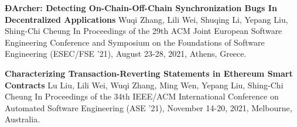 \begin{scholarship}


	{\textbf{ÐArcher: Detecting On-Chain-Off-Chain Synchronization Bugs In Decentralized Applications}}
	{Wuqi Zhang, Lili Wei, Shuqing Li, Yepang Liu, Shing-Chi Cheung}
	\scholarshipentry{}
	{In Proceedings of the 29th ACM Joint European Software Engineering Conference and Symposium on the Foundations of Software Engineering (ESEC/FSE '21), August 23-28, 2021, Athens, Greece.}

	{\textbf{Characterizing Transaction-Reverting Statements in Ethereum Smart Contracts}}
	{Lu Liu, Lili Wei, Wuqi Zhang, Ming Wen, Yepang Liu, Shing-Chi Cheung}
	\scholarshipentry{}
	{In Proceedings of the 34th IEEE/ACM International Conference on Automated Software Engineering (ASE ’21), November 14-20, 2021, Melbourne, Australia.}

\end{scholarship}
